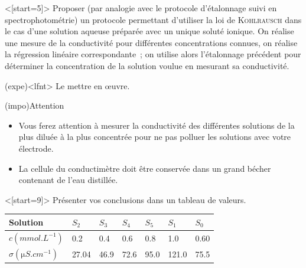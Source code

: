 \documentclass[../main/main.tex]{subfiles}
\begin{document}

\QR<[start=5]>{%
	Proposer (par analogie avec le protocole d'étalonnage suivi en
	spectrophotométrie) un protocole permettant d'utiliser la loi de
	\textsc{Kohlrausch} dans le cas d'une solution aqueuse préparée avec un
	unique soluté ionique.
}{%
	On réalise une mesure de la conductivité pour différentes concentrations
	connues, on réalise la régression linéaire correspondante~; on utilise alors
	l'étalonnage précédent pour déterminer la concentration de la solution voulue
	en mesurant sa conductivité.
}

\begin{tcb}(expe)<lfnt>{}
	Le mettre en œuvre.
\end{tcb}
\begin{tcb}(impo){Attention}
	\begin{itemize}
		\item Vous ferez attention à mesurer la conductivité des différentes
		      solutions de la plus diluée à la plus concentrée pour ne pas polluer les
		      solutions avec votre électrode.
		\item La cellule du conductimètre doit être conservée dans un grand bécher
		      contenant de l'eau distillée.
	\end{itemize}
\end{tcb}

\QR<[start=9]>{%
	Présenter vos conclusions dans un tableau de valeurs.
}{%
	\leavevmode\vspace*{-15pt}\relax
	\begin{center}
		\renewcommand{\arraystretch}{1.3}
		\begin{tabularx}{\linewidth}{|Y*{6}{|Y}|}\hline
			Solution                         &
			$S_2$                            &
			$S_3$                            &
			$S_4$                            &
			$S_5$                            &
			$S_1$                            &
			$S_0$
			\\\hline
			$c (\si{mmol.L^{-1}})$           &
			\num{0.2}                        &
			\num{0.4}                        &
			\num{0.6}                        &
			\num{0.8}                        &
			\num{1.0}                        &
			\num{0.60}
			\\\hline
			$\sigma (\si{\micro S.cm^{-1}})$ &
			\num{27.04}                      &
			\num{46.9}                       &
			\num{72.6}                       &
			\num{95.0}                       &
			\num{121.0}                      &
			\num{75.5}
			\\\hline
		\end{tabularx}
	\end{center}
}
\end{document}
